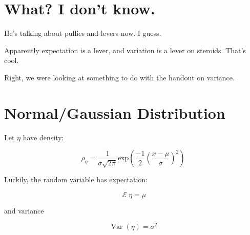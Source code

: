 \documentclass{article}
\DeclareMathOperator{\var}{Var}
\DeclareMathOperator{\E}{\mathcal{E}}
\begin{document}
\section*{What? I don't know.}

He's talking about pullies and levers now. I guess.

Apparently expectation is a lever, and variation is a lever on
steroids. That's cool.

Right, we were looking at something to do with the handout on
variance.

\section*{Normal/Gaussian Distribution}

Let $\eta$ have density:

\[
\rho_{\eta} = \dfrac{1}{\sigma\sqrt{2\pi}} \text{exp}\left(\dfrac{-1}{2}\left(\dfrac{x-\mu}{\sigma}\right)^2\right)
\]

Luckily, the random variable has expectation:

\[
\E\eta =\mu
\]

and variance

\[
\var(\eta)=\sigma^2
\]
\end{document}
